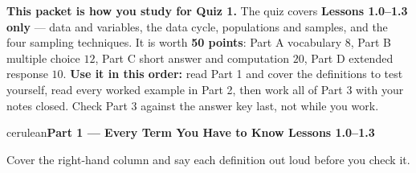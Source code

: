 \documentclass[10pt]{article}
\newcommand{\parthead}[1]{%
  \vspace{6pt}\noindent
  \begin{headlinebox}{cerulean}{\color{white}\bfseries #1}\end{headlinebox}%
  \vspace{4pt}}
\begin{document}
\namedateperiod

\vspace{0.10in}
\begin{remindbox}
\small
\textbf{This packet is how you study for Quiz 1.} The quiz covers
\textbf{Lessons 1.0--1.3 only} --- data and variables, the data cycle, populations and samples,
and the four sampling techniques. It is worth \textbf{50 points}: Part A vocabulary $8$,
Part B multiple choice $12$, Part C short answer and computation $20$, Part D extended
response $10$.
\textbf{Use it in this order:} read Part 1 and cover the definitions to test yourself, read
every worked example in Part 2, then work all of Part 3 with your notes closed. Check Part 3
against the answer key last, not while you work.
\end{remindbox}

\parthead{Part 1 --- Every Term You Have to Know \hfill Lessons 1.0--1.3}

\small
Cover the right-hand column and say each definition out loud before you check it.
\end{document}
